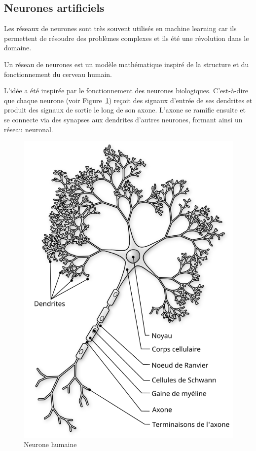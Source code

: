 \clearpage
\subsection{Neurones artificiels}

\par{Les réseaux de neurones sont très souvent utilisés en machine learning car ils permettent de résoudre des problèmes complexes et ils été une révolution dans le domaine.}

\par{Un réseau de neurones est un modèle mathématique inspiré de la structure et du fonctionnement du cerveau humain.}

\par{L'idée a été inspirée par le fonctionnement des neurones biologiques. C'est-à-dire que chaque neurone (voir Figure~\ref{fig:A1_02_neurone_humaine}) reçoit des signaux d'entrée de ses dendrites et produit des signaux de sortie le long de son axone. L'axone se ramifie ensuite et se connecte via des synapses aux dendrites d'autres neurones, formant ainsi un réseau neuronal.}

\begin{figure}[H]  %
    \centering
    \includegraphics[width=0.85\linewidth]{03-tail//A1_fondamentaux_ML//A1_figures/A1_02_neurone_humaine.png}
    \caption{Neurone humaine \cite{noauthor_neurone_2025}}
    \label{fig:A1_02_neurone_humaine}
\end{figure}

